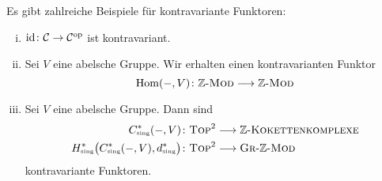 \begin{beispiel} Es gibt zahlreiche Beispiele für kontravariante Funktoren:
	\begin{enumerate}[i),itemsep=0pt]
		\item $\operatorname{id} \colon \mathcal{C} \to \mathcal{C}^{\mathrm{op}}$ ist kontravariant.
		\item Sei $V$ eine abelsche Gruppe. Wir erhalten einen kontravarianten Funktor
		\[
			\operatorname{Hom}(-,V) \colon \mathbb{Z}\text{-}\textsc{Mod}  \longrightarrow \mathbb{Z}\text{-}\textsc{Mod}
		\]
		\item Sei $V$ eine abelsche Gruppe. Dann sind 
		\begin{align}
			C_\sing^*(-,V) &\colon \TOP^2 \longrightarrow \mathbb{Z}\text{-}\textsc{Kokettenkomplexe}  \\
			H^*_\sing \enbrace[\big]{C_\sing^*(-,V),d_\sing^*} &\colon \TOP^2 \longrightarrow \textsc{Gr}\text{-}\mathbb{Z}\text{-}\MOD   
		\end{align}
		kontravariante Funktoren.
	\end{enumerate}
\end{beispiel}

